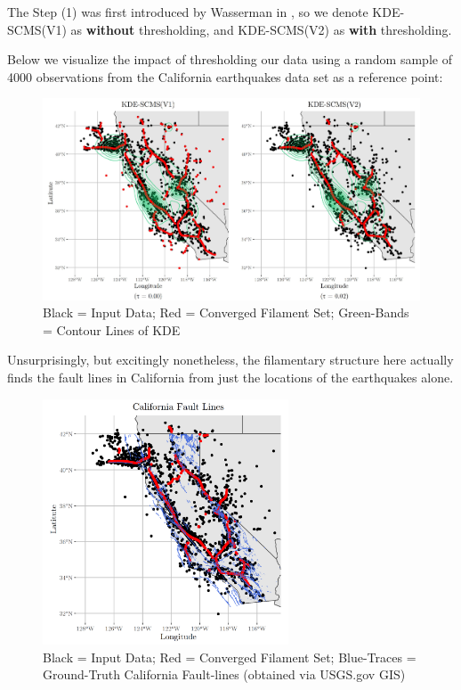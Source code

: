 \documentclass[letterpaper,fleqn]{article}
\theoremstyle{plain}
\theoremstyle{definition}
\newcommand{\1}{\mathds{1}}
\begin{document}
\mbox{}

The Step (1) was first introduced by Wasserman in \cite{SuRF}, so we denote KDE-SCMS(V1) as \textbf{without} thresholding, and KDE-SCMS(V2) as \textbf{with} thresholding. 

Below we visualize the impact of thresholding our data using a random sample of 4000 observations from the California earthquakes data set as a reference point:

\begin{figure}[!htb]
    \includegraphics[width=\textwidth]{combined.jpg}
    \caption{Black = Input Data; Red = Converged Filament Set; Green-Bands = Contour Lines of KDE}%
    \label{fig:thresholding}%
\end{figure}

\newpage

Unsurprisingly, but excitingly nonetheless, the filamentary structure here actually finds the fault lines in California from just the locations of the earthquakes alone.

\begin{figure}[!htb]
    \centering
    \includegraphics[width=0.65\textwidth]{faults_overlay.png}
    \caption{Black = Input Data; Red = Converged Filament Set; Blue-Traces = Ground-Truth California Fault-lines (obtained via USGS.gov GIS)}%
    \label{fig:faultlines}%
\end{figure}
\end{document}
